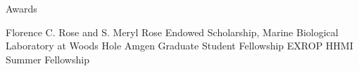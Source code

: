 \begin{rubric}{Awards}

\entry*[2018]
  Florence C. Rose and S. Meryl Rose Endowed Scholarship, Marine Biological
Laboratory at Woods Hole
\entry*[2014]
  Amgen Graduate Student Fellowship
\entry*[2011]
  EXROP HHMI Summer Fellowship


\end{rubric}
